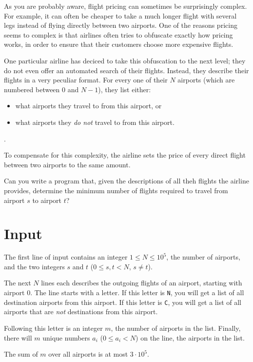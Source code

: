 As you are probably aware, flight pricing can sometimes be surprisingly complex.
For example, it can often be cheaper to take a much longer flight with several legs instead of flying directly between two airports.
One of the reasons pricing seems to complex is that airlines often tries to obfuscate exactly how pricing works, in order to ensure that their customers choose more expensive flights.

One particular airline has deciced to take this obfuscation to the next level; they do not even offer an automated search of their flights.
Instead, they describe their flights in a very peculiar format.
For every one of their $N$ airports (which are numbered between $0$ and $N - 1$), they list either:
\begin{itemize}
    \item what airports they travel to from this airport, or
    \item what airports they \emph{do not} travel to from this airport.
\end{itemize}.

To compensate for this complexity, the airline sets the price of every direct flight between two airports to the same amount.

Can you write a program that, given the descriptions of all theh flights the airline provides, determine the minimum number of flights required to travel from airport $s$ to airport $t$?

\section*{Input}
The first line of input contains an integer $1 \le N \le 10^5$, the number of airports, and the two integers $s$ and $t$ ($0 \le s, t < N$, $s \neq t$).

The next $N$ lines each describes the outgoing flights of an airport, starting with airport $0$.
The line starts with a letter.
If this letter is \texttt{N}, you will get a list of all destination airports from this airport.
If this letter is \texttt{C}, you will get a list of all airports that are \emph{not} destinations from this airport.

Following this letter is an integer $m$, the number of airports in the list.
Finally, there will $m$ unique numbers $a_i$ ($0 \le a_i < N$) on the line, the airports in the list.

The sum of $m$ over all airports is at most $3 \cdot 10^5$.

